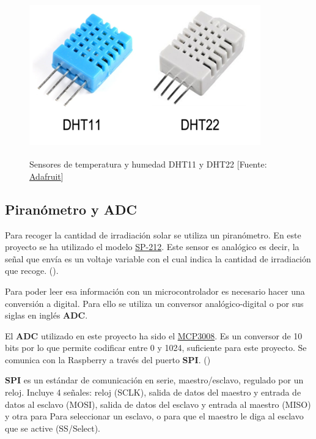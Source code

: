  \begin{figure}[htb]
	
	\begin{center}
		\includegraphics[width=10cm,height=7cm]{figures/sensorTemperaturaHumedad.png}
		\caption{Sensores de temperatura y humedad DHT11 y DHT22 [Fuente: \href{https://cdn-shop.adafruit.com/datasheets/Digital+humidity+and+temperature+sensor+AM2302.pdf}{Adafruit}]}
	\end{center}
	
	\label{sensor}
\end{figure} 

\subsection{Piranómetro y ADC}
\label{makereference2.3.3}
Para recoger la cantidad de irradiación solar se utiliza un piranómetro. En este proyecto se ha utilizado el modelo \href{https://www.apogeeinstruments.co.uk/content/SP-212-215-manual.pdf}{SP-212}. Este sensor es analógico es decir, la señal que envía es un voltaje variable con el cual indica la cantidad de irradiación que recoge. (\cite{ARP:Apogee:2017}).

Para poder leer esa información con un microcontrolador es necesario hacer una conversión a digital. Para ello se utiliza un conversor analógico-digital o por sus siglas en inglés \textbf{ADC}.

El \textbf{ADC} utilizado en este proyecto ha sido el \href{https://cdn-shop.adafruit.com/datasheets/MCP3008.pdf}{MCP3008}. Es un conversor de 10 bits por lo que permite codificar entre 0 y 1024, suficiente para este proyecto. Se comunica con la Raspberry a través del puerto \textbf{SPI}. (\cite{ARP:Adafruit:2017})

\textbf{SPI} es un estándar de comunicación en serie, maestro/esclavo, regulado por un reloj. Incluye 4 señales: reloj (SCLK), salida de datos del maestro y entrada de datos al esclavo (MOSI), salida de datos del esclavo y entrada al maestro (MISO) y otra para Para seleccionar un esclavo, o para que el maestro le diga al esclavo que se active (SS/Select).

